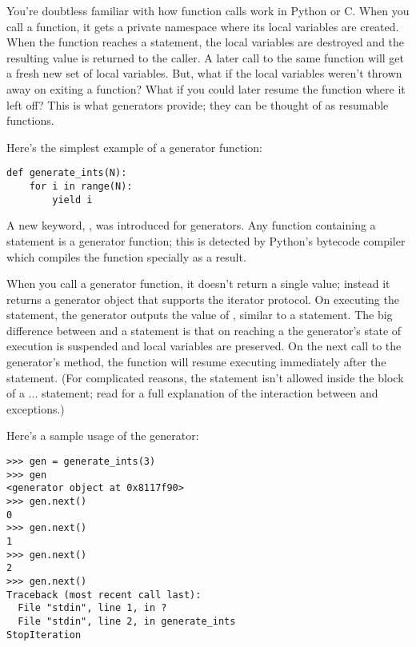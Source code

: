 \documentclass{howto}
\begin{document}
You're doubtless familiar with how function calls work in Python or C.
When you call a function, it gets a private namespace where its local
variables are created.  When the function reaches a 
statement, the local variables are destroyed and the resulting value
is returned to the caller.  A later call to the same function will get
a fresh new set of local variables. But, what if the local variables
weren't thrown away on exiting a function?  What if you could later
resume the function where it left off?  This is what generators
provide; they can be thought of as resumable functions.

Here's the simplest example of a generator function:

\begin{verbatim}
def generate_ints(N):
    for i in range(N):
        yield i
\end{verbatim}

A new keyword, , was introduced for generators.  Any
function containing a  statement is a generator
function; this is detected by Python's bytecode compiler which
compiles the function specially as a result.

When you call a generator function, it doesn't return a single value;
instead it returns a generator object that supports the iterator
protocol.  On executing the  statement, the generator
outputs the value of , similar to a 
statement.  The big difference between  and a
 statement is that on reaching a  the
generator's state of execution is suspended and local variables are
preserved.  On the next call to the generator's  method,
the function will resume executing immediately after the
 statement.  (For complicated reasons, the
 statement isn't allowed inside the  block
of a ... statement; read  for a full
explanation of the interaction between  and
exceptions.)

Here's a sample usage of the  generator:

\begin{verbatim}
>>> gen = generate_ints(3)
>>> gen
<generator object at 0x8117f90>
>>> gen.next()
0
>>> gen.next()
1
>>> gen.next()
2
>>> gen.next()
Traceback (most recent call last):
  File "stdin", line 1, in ?
  File "stdin", line 2, in generate_ints
StopIteration
\end{verbatim}
\end{document}
